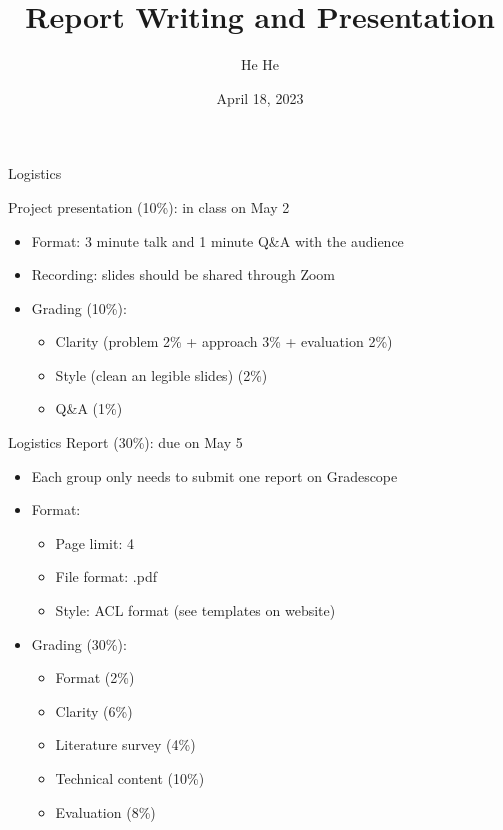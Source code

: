\documentclass[usenames,dvipsnames,11pt,aspectratio=169]{beamer}
\title[CSCI-GA.2590]{Report Writing and Presentation}
\author[He He]{He He
}
\institute[NYU]{New York University}
\date{April 18, 2023}
\begin{document}
\begin{frame}
\titlepage
\end{frame}

\begin{frame}
    {Logistics}

    Project presentation (10\%): in class on May 2\\
    \begin{itemize}
        \item Format: 3 minute talk and 1 minute Q\&A with the audience
        \item Recording: slides should be shared through Zoom
        \item Grading (10\%):
            \begin{itemize}
                \item Clarity (problem 2\% + approach 3\% + evaluation 2\%)
                \item Style (clean an legible slides) (2\%)
                \item Q\&A (1\%)
            \end{itemize}
    \end{itemize}
\end{frame}

\begin{frame}
    {Logistics}
    Report (30\%): due on May 5\\
    \begin{itemize}
        \item Each group only needs to submit one report on Gradescope
        \item Format: 
            \begin{itemize}
                \item Page limit: 4
                \item File format: .pdf
                \item Style: ACL format (see templates on website)
            \end{itemize}
        \item Grading (30\%):
            \begin{itemize}
                \item Format (2\%)
                \item Clarity (6\%)
                \item Literature survey (4\%)
                \item Technical content (10\%) 
                \item Evaluation (8\%)
            \end{itemize}
    \end{itemize}
\end{frame}
\end{document}
